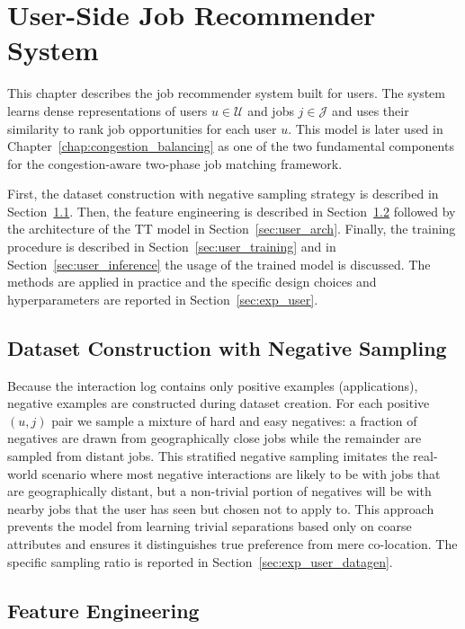 \chapter{User-Side Job Recommender System}
\label{chap:user_recommendation}

This chapter describes the job recommender system built for users. The system learns dense representations of users $u \in \mathcal{U}$ and jobs $j \in \mathcal{J}$ and uses their similarity to rank job opportunities for each user $u$. This model is later used in Chapter~\ref{chap:congestion_balancing} as one of the two fundamental components for the congestion-aware two-phase job matching framework.

First, the dataset construction with negative sampling strategy is described in Section~\ref{sec:dataset_construction}. Then, the feature engineering is described in Section~\ref{sec:user_data_pipeline} followed by the architecture of the \gls{TT} model in Section~\ref{sec:user_arch}. Finally, the training procedure is described in Section~\ref{sec:user_training} and in Section~\ref{sec:user_inference} the usage of the trained model is discussed. The methods are applied in practice and the specific design choices and hyperparameters are reported in Section~\ref{sec:exp_user}.

\section{Dataset Construction with Negative Sampling}
\label{sec:dataset_construction}

Because the interaction log contains only positive examples (applications), negative examples are constructed during dataset creation. For each positive $(u,j)$ pair we sample a mixture of hard and easy negatives: a fraction of negatives are drawn from geographically close jobs while the remainder are sampled from distant jobs. This stratified negative sampling imitates the real-world scenario where most negative interactions are likely to be with jobs that are geographically distant, but a non-trivial portion of negatives will be with nearby jobs that the user has seen but chosen not to apply to. This approach prevents the model from learning trivial separations based only on coarse attributes and ensures it distinguishes true preference from mere co-location. The specific sampling ratio is reported in Section~\ref{sec:exp_user_datagen}.


\section{Feature Engineering}
\label{sec:user_data_pipeline}

